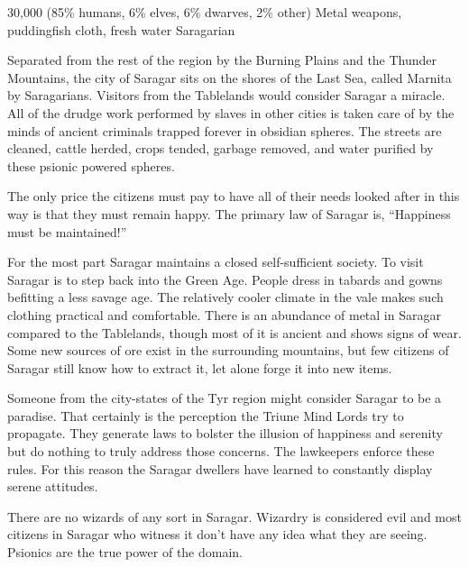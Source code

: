 {30,000 (85\% humans, 6\% elves, 6\% dwarves, 2\% other)}
{Metal weapons, puddingfish cloth, fresh water}
{Saragarian}
{
	Separated from the rest of the region by the Burning Plains and the Thunder Mountains, the city of Saragar sits on the shores of the Last Sea, called Marnita by Saragarians. Visitors from the Tablelands would consider Saragar a miracle. All of the drudge work performed by slaves in other cities is taken care of by the minds of ancient criminals trapped forever in obsidian spheres. The streets are cleaned, cattle herded, crops tended, garbage removed, and water purified by these psionic powered spheres.

	The only price the citizens must pay to have all of their needs looked after in this way is that they must remain happy. The primary law of Saragar is, ``Happiness must be maintained!''
}
{
	For the most part Saragar maintains a closed self-sufficient society. To visit Saragar is to step back into the Green Age. People dress in tabards and gowns befitting a less savage age. The relatively cooler climate in the vale makes such clothing practical and comfortable. There is an abundance of metal in Saragar compared to the Tablelands, though most of it is ancient and shows signs of wear. Some new sources of ore exist in the surrounding mountains, but few citizens of Saragar still know how to extract it, let alone forge it into new items.

	Someone from the city-states of the Tyr region might consider Saragar to be a paradise. That certainly is the perception the Triune Mind Lords try to propagate. They generate laws to bolster the illusion of happiness and serenity but do nothing to truly address those concerns. The lawkeepers enforce these rules. For this reason the Saragar dwellers have learned to constantly display serene attitudes.

	There are no wizards of any sort in Saragar. Wizardry is considered evil and most citizens in Saragar who witness it don't have any idea what they are seeing. Psionics are the true power of the domain.
}

